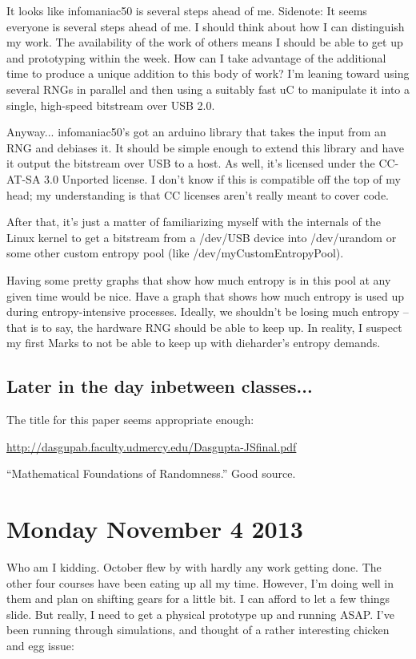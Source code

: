 \documentclass[journal]{IEEEtran}
\begin{document}
It looks like infomaniac50 is several steps ahead of me. Sidenote: It seems 
everyone is several steps ahead of me. I should think about how I can 
distinguish my work. The availability of the work of others means I should be 
able to get up and prototyping within the week. How can I take advantage of 
the additional time to produce a unique addition to this body of work? I'm 
leaning toward using several RNGs in parallel and then using a suitably fast 
uC to manipulate it into a single, high-speed bitstream over USB 2.0.

Anyway... infomaniac50's got an arduino library that takes the input from an
RNG and debiases it. It should be simple enough to extend this library and 
have it output the bitstream over USB to a host. As well, it's licensed 
under the CC-AT-SA 3.0 Unported license. I don't know if this is compatible 
off the top of my head; my understanding is that CC licenses aren't really 
meant to cover code.

After that, it's just a matter of familiarizing myself with the internals of 
the Linux kernel to get a bitstream from a /dev/USB device into /dev/urandom 
or some other custom entropy pool (like /dev/myCustomEntropyPool).

Having some pretty graphs that show how much entropy is in this pool at any 
given time would be nice. Have a graph that shows how much entropy is used 
up during entropy-intensive processes. Ideally, we shouldn't be losing much 
entropy --that is to say, the hardware RNG should be able to keep up. In 
reality, I suspect my first Marks to not be able to keep up with dieharder's 
entropy demands.

\subsection{Later in the day inbetween classes...}

The title for this paper seems appropriate enough:

\url{http://dasgupab.faculty.udmercy.edu/Dasgupta-JSfinal.pdf}

``Mathematical Foundations of Randomness.'' Good source.

\section{Monday November 4 2013}

Who am I kidding. October flew by with hardly any work getting done. The
other four courses have been eating up all my time. However, I'm doing well
in them and plan on shifting gears for a little bit. I can afford to let
a few things slide. But really, I need to get a physical prototype up and
running ASAP. I've been running through simulations, and thought of a
rather interesting chicken and egg issue:
\end{document}
